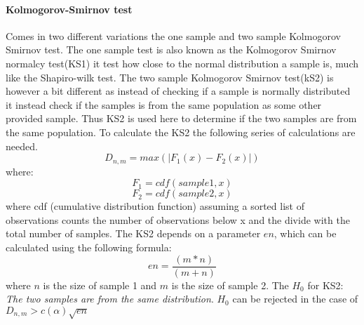 \paragraph{Kolmogorov-Smirnov test}
Comes in two different variations the one sample and two sample Kolmogorov Smirnov test. The one sample test is also known as the Kolmogorov Smirnov normalcy test(KS1) it test how close to the normal distribution a sample is, much like the Shapiro-wilk test. The two sample Kolmogorov Smirnov test(kS2) is however a bit different as instead of checking if a sample is normally distributed it instead check if the samples is from the same population as some other provided sample. Thus KS2 is used here to determine if the two samples are from the same population. To calculate the KS2 the following series of calculations are needed.
$$D_{n,m} = max(|F_1(x)-F_2(x)|)$$
where:
$$F_1 = cdf(sample1,x)$$
$$F_2 = cdf(sample2,x)$$
where cdf (cumulative distribution function) assuming a sorted list of observations counts the number of observations below x and the divide with the total number of samples. The KS2 depends on a parameter $en$, which can be calculated using the following formula:
$$en=\frac{(m*n)}{(m+n)}$$
where $n$ is the size of sample 1 and $m$ is the size of sample 2.
The $H_0$ for KS2: \textit{The two samples are from the same distribution}.
$H_0$ can be rejected in the case of $D_{n,m} > c(\alpha)\sqrt{en}$\cite{massey1951kolmogorov}

